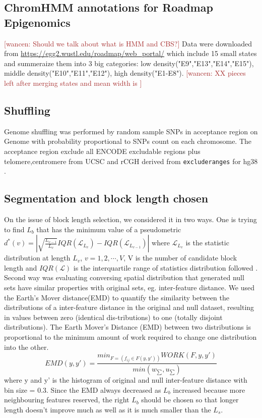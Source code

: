 \documentclass{article}
\newcommand{\code}[1]{\texttt{#1}}
\newcommand{\wancen}[1]{\textcolor{Brown}{[wancen: #1]}}
\begin{document}
\subsection{ChromHMM annotations for Roadmap Epigenomics}
\wancen{Should we talk about what is HMM and CBS?}
Data were downloaded from \url{https://egg2.wustl.edu/roadmap/web_portal/} which include 15 small states and summeraize them into 3 big categories: low density("E9","E13","E14","E15"), middle density("E10","E11","E12"), high density("E1-E8"). \wancen{XX pieces left after merging states and mean width is }

\subsection{Shuffling}\label{sec:shuffle}
Genome shuffling was performed by random sample SNPs in acceptance region on Genome with probability proportional to SNPs count on each chromosome. The acceptance region exclude all ENCODE excludable regions plus telomere,centromere from UCSC and rCGH derived from \code{excluderanges} for hg38 \citep{excluderanges}.

\subsection{Segmentation and block length chosen}
On the issue of 
block length selection, we considered it in two ways. One is trying to find $L_b$ that has the minimum value of a pseudometric $d^*(v)=|\sqrt{\frac{L_{v-1}}{L_v}}IQR(\mathcal{L}_{L_v})-IQR(\mathcal{L}_{L_{v-1}})|$ where $\mathcal{L}_{L_v}$ is the statistic distribution at length $L_v$, $v=1,2,\cdots,V$, V is the number of candidate block length and $IQR(\mathcal{L})$ is the interquartile range of statistics distribution followed \citet{bickel2010subsampling}.
Second way was evaluating conversing spatial distribution that generated null sets have similar properties with original sets, eg. inter-feature distance. We used the Earth's Mover distance(EMD) to quantify the similarity between the distributions of a inter-feature distance in the original  and  null  dataset,  resulting  in  values  between  zero  (identical  dis-tributions)  to  one  (totally  disjoint  distributions). The Earth Mover's Distance (EMD) between two distributions is proportional to the minimum amount of work required to change one distribution into the other. $$EMD(y,y') = \frac{min_{F=(f_{ij}\in \mathcal{}F(y,y'))} WORK(F,y,y')}{min(w_{\sum},u_{\sum})}$$ where y and y' is the histogram of original and null inter-feature distance with bin size = 0.3. Since the EMD always decreased as $L_b$ increased because more neighbouring features reserved, the right $L_b$ should be chosen so that longer length doesn’t improve much as well as it is much smaller than the $L_s$.
\end{document}
